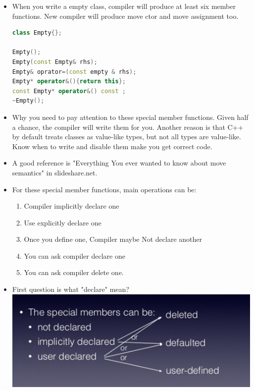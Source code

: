 \documentclass[a4paper,12pt,twoside]{book}
\begin{document}
\begin{itemize}

\item When you write a empty class, compiler will produce at least six member functions.  New compiler will produce move ctor and move assignment too.
\begin{lstlisting}[frame=single, language=c++]
class Empty{};

Empty();
Empty(const Empty& rhs);
Empty& oprator=(const empty & rhs);
Empty* operator&(){return this};
const Empty* operator&() const ;
~Empty();
\end{lstlisting}

\item Why you need to pay attention to these special member functions.  Given half a chance, the compiler will write them for you. Another reason is that C++ by default treats classes as value-like types, but not all types are value-like. Know when to write and disable them make you get correct code.
\item A good reference is "Everything You ever wanted to know about move semantics" in slideshare.net.

\item For these special member functions, main operations can be:
\begin{enumerate}
\item Compiler implicitly declare one
\item Use explicitly declare one
\item Once you define one, Compiler maybe Not declare another
\item You can ask compiler declare one
\item You can ask compiler delete one.
\end{enumerate}

\item First question is what "declare" mean?  \\
\includegraphics[scale=0.6]{pics/sm1.png} \newline


\end{itemize}
\end{document}
